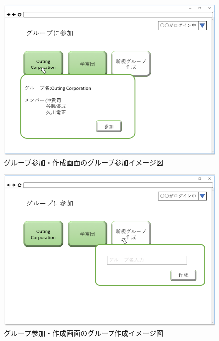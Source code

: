 \begin{figure}[phtbp]
  \begin{center}
    \includegraphics[width=1\linewidth,clip]{./img/26.png}
    \caption{グループ参加・作成画面のグループ参加イメージ図}\label{fig:26}
  \end{center}
\end{figure}

\begin{figure}[phtbp]
  \begin{center}
    \includegraphics[width=1\linewidth,clip]{./img/27.png}
    \caption{グループ参加・作成画面のグループ作成イメージ図}\label{fig:27}
  \end{center}
\end{figure}

\newpage

